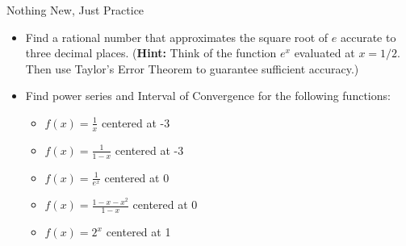 \begin{exercise}{Nothing New, Just Practice \Coffeecup \Coffeecup}
\begin{itemize}
\begin{itemize}
\end{itemize}
\begin{comment}

\item  \begin{itemize} \item List by hand how many ways you could make change for 35 cents using nickels, dimes, and quarters.

\vspace*{2in}

\item Show how you would use geometric series as generating functions to reach this same conclusion.  Verify your answers match.

\vspace*{3in}
\end{itemize}

\end{comment}
\item Find a rational number that approximates the square root of $e$ accurate to three decimal places.  ({\bf Hint:} Think of the function $e^{x}$ evaluated at $x={1/2}$.  Then use Taylor's Error Theorem to guarantee sufficient accuracy.)
\vspace*{3in}

\item Find power series and Interval of Convergence for the following functions:

\begin{itemize} \item $f(x)=\frac{1}{x}$ centered at -3

\vspace*{1in}

\item $f(x)=\frac{1}{1-x}$ centered at -3

\vspace*{1in}

\item $f(x)=\frac{1}{e^x}$ centered at 0

\vspace*{1in}

\item $f(x)=\frac{1-x-x^2}{1-x}$ centered at 0

\vspace*{1in}

\item $f(x)=2^x$ centered at 1

\vspace*{1in}


\end{itemize}
\end{itemize}
\end{exercise}
